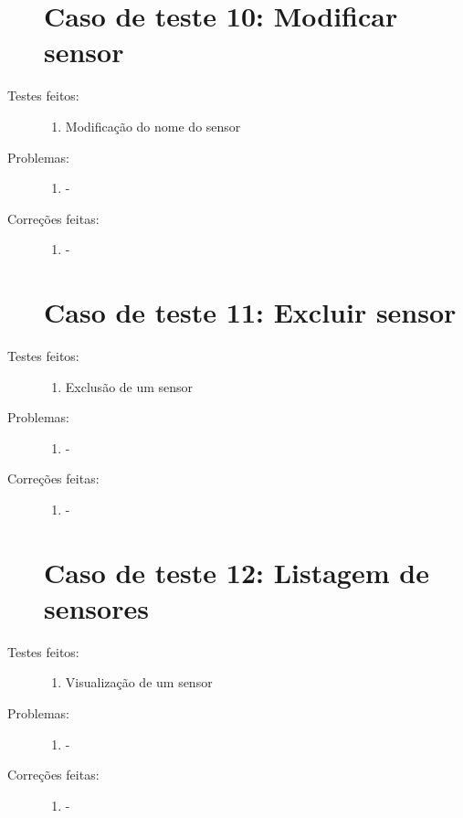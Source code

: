 \begin{description}
  \section{Caso de teste 10: Modificar sensor}
  \item[Testes feitos:]
  \begin{enumerate}
    \item{Modificação do nome do sensor}
  \end{enumerate}
  \item[Problemas:]
  \begin{enumerate}
    \item{-}
  \end{enumerate}
  \item[Correções feitas:]
  \begin{enumerate}
    \item{-}
  \end{enumerate}  

  \section{Caso de teste 11: Excluir sensor}
  \item[Testes feitos:]
  \begin{enumerate}
    \item{Exclusão de um sensor}
  \end{enumerate}
  \item[Problemas:]
  \begin{enumerate}
    \item{-}
  \end{enumerate}
  \item[Correções feitas:]
  \begin{enumerate}
    \item{-}
  \end{enumerate}

  \section{Caso de teste 12: Listagem de sensores}
  \item[Testes feitos:]
  \begin{enumerate}
    \item{Visualização de um sensor}
  \end{enumerate}
  \item[Problemas:]
  \begin{enumerate}
    \item{-}
  \end{enumerate}
  \item[Correções feitas:]
  \begin{enumerate}
    \item{-}
  \end{enumerate}


\end{description}
